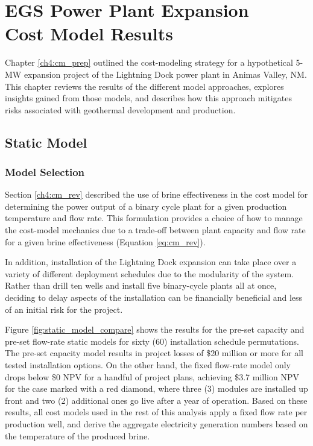 \chapter{EGS Power Plant Expansion\\Cost Model Results}\label{ch6:cm_results}

Chapter \ref{ch4:cm_prep} outlined the cost-modeling strategy for a hypothetical 5-MW expansion project of the Lightning Dock power plant in Animas Valley, NM. This chapter reviews the results of the different model approaches, explores insights gained from those models, and describes how this approach mitigates risks associated with geothermal development and production.

\section{Static Model}\label{ch6:static_mod}

\subsection{Model Selection}\label{ch6:static_select}

Section \ref{ch4:cm_rev} described the use of brine effectiveness in the cost model for determining the power output of a binary cycle plant for a given production temperature and flow rate. This formulation provides a choice of how to manage the cost-model mechanics due to a trade-off between plant capacity and flow rate for a given brine effectiveness (Equation \ref{eq:cm_rev}).

In addition, installation of the Lightning Dock expansion can take place over a variety of different deployment schedules due to the modularity of the system. Rather than drill ten wells and install five binary-cycle plants all at once, deciding to delay aspects of the installation can be financially beneficial and less of an initial risk for the project.

Figure \ref{fig:static_model_compare} shows the results for the pre-set capacity and pre-set flow-rate static models for sixty (60) installation schedule permutations. The pre-set capacity model results in project losses of \$20 million or more for all tested installation options. On the other hand, the fixed flow-rate model only drops below \$0 NPV for a handful of project plans, achieving \$3.7 million NPV for the case marked with a red diamond, where three (3) modules are installed up front and two (2) additional ones go live after a year of operation. Based on these results, all cost models used in the rest of this analysis apply a fixed flow rate per production well, and derive the aggregate electricity generation numbers based on the temperature of the produced brine.

